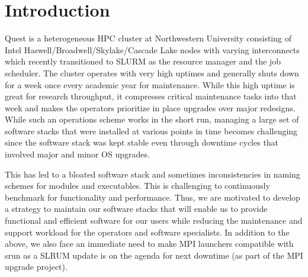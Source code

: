 \documentclass[sigconf,authordraft]{acmart}
\begin{document}


\maketitle

\section{Introduction}

Quest is a heterogeneous HPC cluster\cite{quest} at Northwestern University consisting of Intel Haswell/Broadwell/Skylake/Cascade Lake nodes with varying interconnects which recently transitioned to SLURM\cite{slurm} as the resource manager and the job scheduler. The cluster operates with very high uptimes and generally shuts down for a week once every academic year for maintenance. While this high uptime is great for research throughput, it compresses critical maintenance tasks into that week and makes the operators prioritize in place upgrades over major redesigns. While such an operations scheme works in the short run, managing a large set of software stacks that were installed at various points in time becomes challenging since the software stack was kept stable even through downtime cycles that involved major and minor OS upgrades.

This has led to a bloated software stack and sometimes inconsistencies in naming schemes for modules and executables. This is challenging to continuously benchmark for functionality and performance. Thus, we are motivated to develop a strategy to maintain our software stacks that will enable us to provide functional and efficient software for our users while reducing the maintenance and support workload for the operators and software specialists. In addition to the above, we also face an immediate need to make MPI launchers compatible with srun as a SLRUM update is on the agenda for next downtime (as part of the MPI upgrade project).
\end{document}
